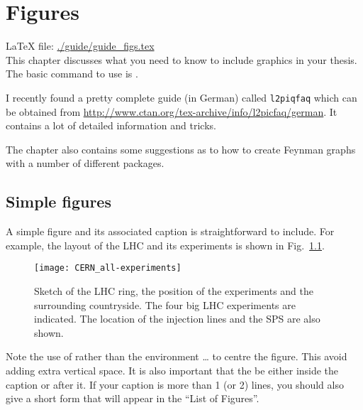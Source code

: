 \chapter{Figures}
\label{sec:fig}

\LaTeX{} file: \url{./guide/guide_figs.tex}\\[1ex]
\noindent
This chapter discusses what you need to know to include graphics in
your thesis. The basic command to use is .

I recently found a pretty complete guide (in German) called \texttt{l2piqfaq}
which can be obtained from
\url{http://www.ctan.org/tex-archive/info/l2picfaq/german}. It contains
a lot of detailed information and tricks.

The chapter also contains some suggestions as to how to create Feynman
graphs with a number of different packages.

\section{Simple figures}
\label{sec:fig:simple}

A simple figure and its associated caption is straightforward to
include. For example, the layout of the LHC and its experiments is
shown in Fig.~\ref{fig:LHC}.

\begin{figure}[htbp]
  \centering
  \texttt{[image: CERN\_all-experiments]}
  \caption[Sketch of the LHC ring, the position of the experiments and
  the surrounding countryside.]{Sketch of the LHC ring, the position
    of the experiments and the surrounding countryside. The four big
    LHC experiments are indicated. The location of the injection lines
    and the SPS are also shown.}
  \label{fig:LHC}
\end{figure}

Note the use of  rather than the environment
 \ldots {} to centre the figure. This
avoid adding extra vertical space. It is also important that the
 be either inside the caption or after it. If your
caption is more than 1 (or 2) lines, you should also give a short form
that will appear in the ``List of Figures''.

